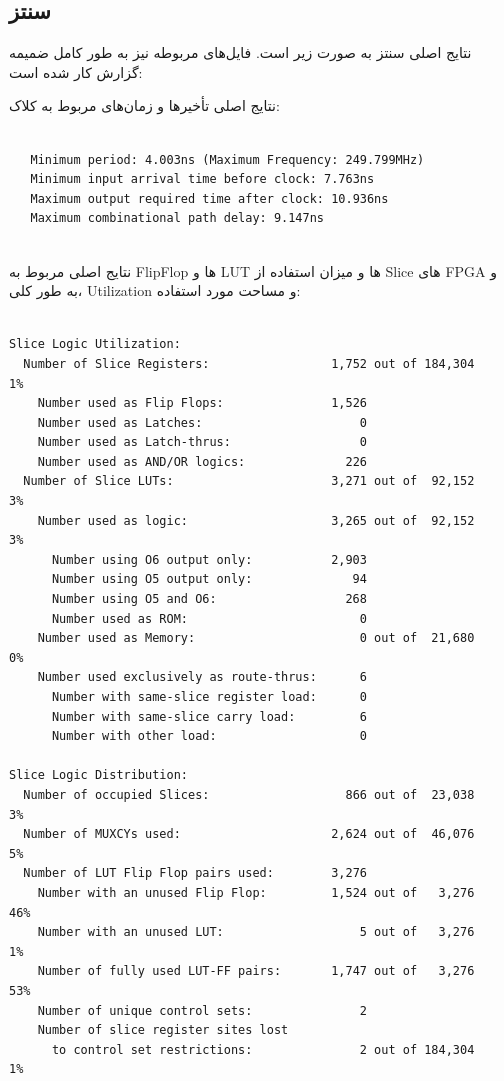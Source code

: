\documentclass[12pt,titlepage,a4page , tikz , multi,table , svgnames,xcdraw]{article}
\begin{document}
\subsection{سنتز }

نتایج اصلی سنتز به صورت زیر است. فایل‌های مربوطه نیز به طور کامل ضمیمه گزارش کار شده است:

نتایج اصلی تأخیرها و زمان‌های مربوط به کلاک:

\begin{latin}
\begin{verbatim}

   Minimum period: 4.003ns (Maximum Frequency: 249.799MHz)
   Minimum input arrival time before clock: 7.763ns
   Maximum output required time after clock: 10.936ns
   Maximum combinational path delay: 9.147ns


\end{verbatim}
\end{latin}


نتایج اصلی مربوط به FlipFlop ها و LUT ها و میزان استفاده از Slice های FPGA و به طور کلی، Utilization و مساحت مورد استفاده:

\begin{latin}
\begin{verbatim}

Slice Logic Utilization:
  Number of Slice Registers:                 1,752 out of 184,304    1%
    Number used as Flip Flops:               1,526
    Number used as Latches:                      0
    Number used as Latch-thrus:                  0
    Number used as AND/OR logics:              226
  Number of Slice LUTs:                      3,271 out of  92,152    3%
    Number used as logic:                    3,265 out of  92,152    3%
      Number using O6 output only:           2,903
      Number using O5 output only:              94
      Number using O5 and O6:                  268
      Number used as ROM:                        0
    Number used as Memory:                       0 out of  21,680    0%
    Number used exclusively as route-thrus:      6
      Number with same-slice register load:      0
      Number with same-slice carry load:         6
      Number with other load:                    0

Slice Logic Distribution:
  Number of occupied Slices:                   866 out of  23,038    3%
  Number of MUXCYs used:                     2,624 out of  46,076    5%
  Number of LUT Flip Flop pairs used:        3,276
    Number with an unused Flip Flop:         1,524 out of   3,276   46%
    Number with an unused LUT:                   5 out of   3,276    1%
    Number of fully used LUT-FF pairs:       1,747 out of   3,276   53%
    Number of unique control sets:               2
    Number of slice register sites lost
      to control set restrictions:               2 out of 184,304    1%


\end{verbatim}
\end{latin}
\end{document}
